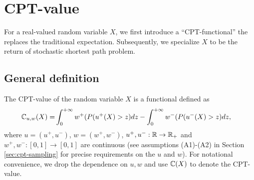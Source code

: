 \documentclass[11pt,letterpaper,english]{article}
\begin{document}
\section{CPT-value}
\label{sec:cpt-val}
For a real-valued random variable $X$, we first introduce a ``CPT-functional'' the replaces the traditional expectation. Subsequently, we specialize $X$ to be the return of stochastic shortest path problem.
\subsection{General definition}
The CPT-value of the random variable $X$ is a functional defined as
\begin{align}
\mathbb{C}_{u,w}(X) = &\int_0^{+\infty} w^+(P(u^+(X)>z) dz - \int_0^{+\infty} w^-(P(u^-(X)>z) dz, \label{eq:cpt-general}
\end{align}
where $u=(u^+,u^-)$, $w=(w^+,w^-)$, $u^+,u^-:\mathbb{R}\rightarrow \mathbb{R}_+$ and $w^+,w^-:[0,1] \rightarrow [0,1]$ are continuous (see assumptions (A1)-(A2) in Section \ref{sec:cpt-sampling} for precise requirements on the $u$ and $w$). For notational convenience, we drop the dependence on $u,w$ and use $\mathbb{C}(X)$ to denote the CPT-value.  
\end{document}
